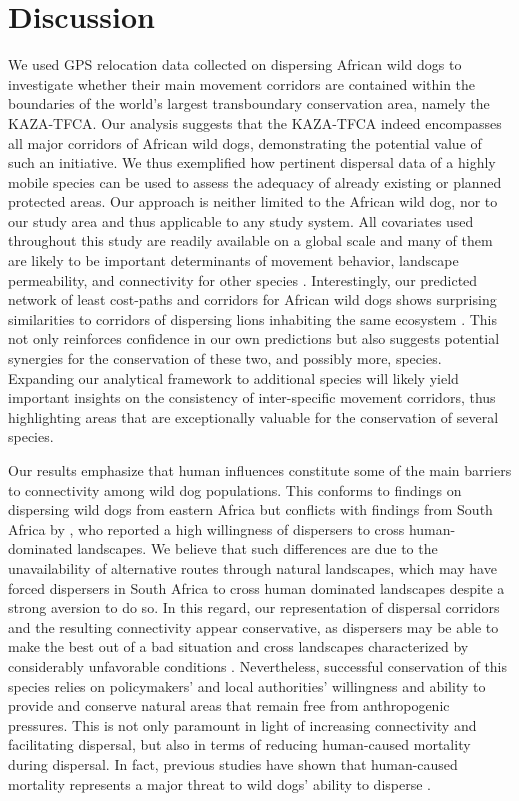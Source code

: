 \documentclass[abstract=on,10pt,a4paper,bibliography=totocnumbered]{article}
\begin{document}
\section{Discussion}
We used GPS relocation data collected on dispersing African wild dogs to
investigate whether their main movement corridors are contained within the
boundaries of the world's largest transboundary conservation area, namely the
KAZA-TFCA. Our analysis suggests that the KAZA-TFCA indeed encompasses all major
corridors of African wild dogs, demonstrating the potential value of such an
initiative. We thus exemplified how pertinent dispersal data of a highly mobile
species can be used to assess the adequacy of already existing or planned
protected areas. Our approach is neither limited to the African wild dog, nor to
our study area and thus applicable to any study system. All covariates used
throughout this study are readily available on a global scale and many of them
are likely to be important determinants of movement behavior, landscape
permeability, and connectivity for other species \citep{Thurfjell.2014,
Zeller.2012}. Interestingly, our predicted network of least cost-paths and
corridors for African wild dogs shows surprising similarities to corridors of
dispersing lions inhabiting the same ecosystem \citep{Elliot.2014,
Cushman.2018}. This not only reinforces confidence in our own predictions but
also suggests potential synergies for the conservation of these two, and
possibly more, species. Expanding our analytical framework to additional species
will likely yield important insights on the consistency of inter-specific
movement corridors, thus highlighting areas that are exceptionally valuable for
the conservation of several species.

Our results emphasize that human influences constitute some of the main barriers
to connectivity among wild dog populations. This conforms to findings on
dispersing wild dogs from eastern Africa \citep{Masenga.2016, Oneill.2020} but
conflicts with findings from South Africa by \cite{DaviesMostert.2012}, who
reported a high willingness of dispersers to cross human-dominated landscapes.
We believe that such differences are due to the unavailability of alternative
routes through natural landscapes, which may have forced dispersers in South
Africa to cross human dominated landscapes despite a strong aversion to do so.
In this regard, our representation of dispersal corridors and the resulting
connectivity appear conservative, as dispersers may be able to make the best out
of a bad situation and cross landscapes characterized by considerably
unfavorable conditions \citep{Palomares.2000, Elliot.2014}. Nevertheless,
successful conservation of this species relies on policymakers' and local
authorities' willingness and ability to provide and conserve natural areas that
remain free from anthropogenic pressures. This is not only paramount in light of
increasing connectivity and facilitating dispersal, but also in terms of
reducing human-caused mortality during dispersal. In fact, previous studies have
shown that human-caused mortality represents a major threat to wild dogs'
ability to disperse \citep{Woodroffe.2019, Cozzi.2020}.
\end{document}
